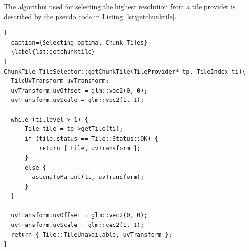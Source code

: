 The algorithm used for selecting the highest resolution  from a tile provider is described by the pseudo code in Listing \ref{lst:getchunktile}.

\begin{lstlisting}[
  caption={Selecting optimal Chunk Tiles} 
  \label{lst:getchunktile}
]
ChunkTile TileSelector::getChunkTile(TileProvider* tp, TileIndex ti){
  TileUvTransform uvTransform;
  uvTransform.uvOffset = glm::vec2(0, 0);
  uvTransform.uvScale = glm::vec2(1, 1);

  while (ti.level > 1) {
      Tile tile = tp->getTile(ti);
      if (tile.status == Tile::Status::OK) {
          return { tile, uvTransform };
      }
      else {
        ascendToParent(ti, uvTransform);
      }
  }

  uvTransform.uvOffset = glm::vec2(0, 0);
  uvTransform.uvScale = glm::vec2(1, 1);
  return { Tile::TileUnavailable, uvTransform };
}
\end{lstlisting}

